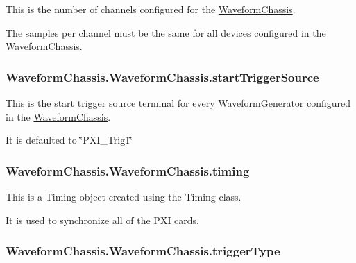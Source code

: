 This is the number of channels configured for the \hyperlink{class_waveform_chassis_1_1_waveform_chassis}{Waveform\-Chassis}. 

The samples per channel must be the same for all devices configured in the \hyperlink{class_waveform_chassis_1_1_waveform_chassis}{Waveform\-Chassis}. \hypertarget{class_waveform_chassis_1_1_waveform_chassis_a73f6eace1feef22a221d458a3809c338}{
\subsubsection[{start\-Trigger\-Source}]{\setlength{\rightskip}{0pt plus 5cm}Waveform\-Chassis.\-Waveform\-Chassis.\-start\-Trigger\-Source}}\label{class_waveform_chassis_1_1_waveform_chassis_a73f6eace1feef22a221d458a3809c338}


This is the start trigger source terminal for every Waveform\-Generator configured in the \hyperlink{class_waveform_chassis_1_1_waveform_chassis}{Waveform\-Chassis}. 

It is defaulted to \char`\"{}\-P\-X\-I\-\_\-\-Trig1\char`\"{} \hypertarget{class_waveform_chassis_1_1_waveform_chassis_a3893045e5a6a259762feb0ee2f313648}{
\subsubsection[{timing}]{\setlength{\rightskip}{0pt plus 5cm}Waveform\-Chassis.\-Waveform\-Chassis.\-timing}}\label{class_waveform_chassis_1_1_waveform_chassis_a3893045e5a6a259762feb0ee2f313648}


This is a Timing object created using the Timing class. 

It is used to synchronize all of the P\-X\-I cards. \hypertarget{class_waveform_chassis_1_1_waveform_chassis_af6dd8a668436712fc2cc9dab2fc8ef6f}{
\subsubsection[{trigger\-Type}]{\setlength{\rightskip}{0pt plus 5cm}Waveform\-Chassis.\-Waveform\-Chassis.\-trigger\-Type}}\label{class_waveform_chassis_1_1_waveform_chassis_af6dd8a668436712fc2cc9dab2fc8ef6f}


